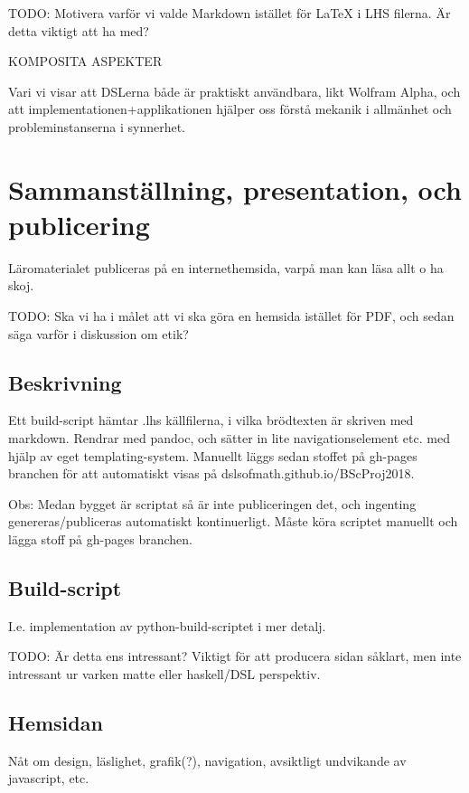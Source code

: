 \begin{binge}
TODO: Motivera varför vi valde Markdown istället för LaTeX i LHS filerna. Är detta viktigt att ha med?

KOMPOSITA ASPEKTER

Vari vi visar att DSLerna både är praktiskt användbara, likt Wolfram
Alpha, och att implementationen+applikationen hjälper oss förstå
mekanik i allmänhet och probleminstanserna i synnerhet.

\section{Sammanställning, presentation, och publicering}

  Läromaterialet publiceras på en internethemsida, varpå man kan läsa
  allt o ha skoj.

TODO: Ska vi ha i målet att vi ska göra en hemsida istället för PDF, och sedan säga varför i diskussion om etik?

  \subsection{Beskrivning}

  Ett build-script hämtar .lhs källfilerna, i vilka brödtexten är
  skriven med markdown. Rendrar med pandoc, och sätter in lite
  navigationselement etc. med hjälp av eget templating-system. Manuellt
  läggs sedan stoffet på gh-pages branchen för att automatiskt visas på
  dslsofmath.github.io/BScProj2018.

  Obs: Medan bygget är scriptat så är inte publiceringen det, och
  ingenting genereras/publiceras automatiskt kontinuerligt. Måste köra
  scriptet manuellt och lägga stoff på gh-pages branchen.

  \subsection{Build-script}

  I.e. implementation av python-build-scriptet i mer detalj.

  TODO: Är detta ens intressant? Viktigt för att producera sidan såklart, men
  inte intressant ur varken matte eller haskell/DSL perspektiv.

  \subsection{Hemsidan}

  Nåt om design, läslighet, grafik(?), navigation, avsiktligt undvikande
  av javascript, etc.


\end{binge}
